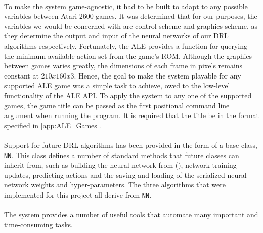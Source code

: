 \paragraph{}

To make the system game-agnostic, it had to be built to adapt to any possible variables between Atari 2600 games. It was determined that for our purposes, the variables we would be concerned with are control scheme and graphics scheme, as they determine the output and input of the neural networks of our DRL algorithms respectively. Fortunately, the ALE provides a function for querying the minimum available action set from the game's ROM. Although the graphics between games varies greatly, the dimensions of each frame in pixels remains constant at $210x160x3$. Hence, the goal to make the system playable for any supported ALE game was a simple task to achieve, owed to the low-level functionality of the ALE API. To apply the system to any one of the supported games, the game title can be passed as the first positional command line argument when running the program. It is required that the title be in the format specified in \ref{app:ALE_Games}. \paragraph{}

Support for future DRL algorithms has been provided in the form of a base class, \texttt{NN}. This class defines a number of standard methods that future classes can inherit from, such as building the neural network from (\citet{human}), network training updates, predicting actions and the saving and loading of the serialized neural network weights and hyper-parameters. The three algorithms that were implemented for this project all derive from \texttt{NN}. \paragraph{}

The system provides a number of useful tools that automate many important and time-consuming tasks.

